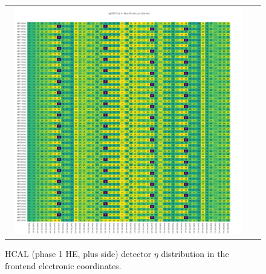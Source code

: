 \clearpage
\begin{figure}[htb]
 \begin{center}
  \begin{tabular}{cc}
   \includegraphics[angle=0,width=0.95\textwidth]{figures/appendix/ngHEP_Eta_in_FrontEnd.png}
  \end{tabular}
	\caption{HCAL (phase 1 HE, plus side) detector $\eta$ distribution in the frontend electronic coordinates.}
  \label{fig:lmapngHEPEtaFEC}
 \end{center}
\end{figure}

